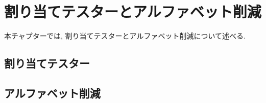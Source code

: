 \chapter{割り当てテスターとアルファベット削減} \label{chap:assignment-tester-and-alphabet-reduction}

本チャプターでは, 割り当てテスターとアルファベット削減について述べる.

\section{割り当てテスター}

\section{アルファベット削減}

